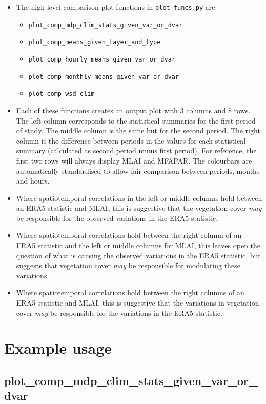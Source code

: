 \begin{itemize}
	\item The high-level comparison plot functions in \verb+plot_funcs.py+ are: 
	\begin{itemize}
		\item \verb+plot_comp_mdp_clim_stats_given_var_or_dvar+
		\item \verb+plot_comp_means_given_layer_and_type+
		\item \verb+plot_comp_hourly_means_given_var_or_dvar+
		\item \verb+plot_comp_monthly_means_given_var_or_dvar+
		\item \verb+plot_comp_wsd_clim+
	\end{itemize}
	\item Each of these functions creates an output plot with 3 columns and 8 rows. The left column corresponds to the statistical summaries for the first period of study. The middle column is the same but for the second period. The right column is the difference between periods in the values for each statistical summary (calculated as second period minus first period). For reference, the first two rows will always display MLAI and MFAPAR. The colourbars are automatically standardised to allow fair comparison between periods, months and hours.
	\item Where spatiotemporal correlations in the left or middle columns hold between an ERA5 statistic and MLAI, this is suggestive that the vegetation cover \textit{may} be responsible for the observed variations in the ERA5 statistic.
	\item Where spatiotemporal correlations hold between the right column of an ERA5 statistic and the left or middle columns for MLAI, this leaves open the question of what is causing the observed variations in the ERA5 statistic, but suggests that vegetation cover \textit{may} be responsible for modulating these variations.
	\item Where spatiotemporal correlations hold between the right columns of an ERA5 statistic and MLAI, this is suggestive that the variations in vegetation cover \textit{may} be responsible for the variations in the ERA5 statistic.
\end{itemize}

\section{Example usage}

\subsection{plot\_comp\_mdp\_clim\_stats\_given\_var\_or\_dvar}


